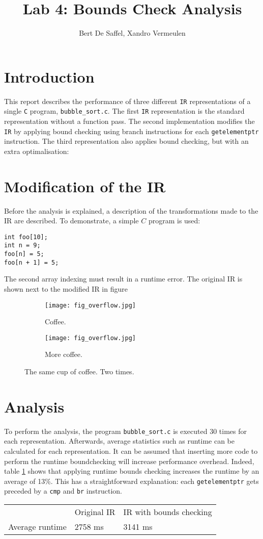 \documentclass{article}
\begin{document}
	\title{Lab 4: Bounds Check Analysis}
	\author{Bert De Saffel, Xandro Vermeulen}
	\maketitle
	\tableofcontents
	\section{Introduction}
	This report describes the performance of three different \texttt{IR} representations of a single \texttt{C} program, \texttt{bubble\_sort.c}. The first \texttt{IR} representation is the standard representation without a function pass. The second implementation modifies the \texttt{IR} by applying bound checking using branch instructions for each \texttt{getelementptr} instruction. The third representation also applies bound checking, but with an extra optimalisation: 
	
	\section{Modification of the IR}
	Before the analysis is explained, a description of the transformations made to the IR are described. To demonstrate, a simple $C$ program is used:
	\begin{lstlisting}
int foo[10];
int n = 9;
foo[n] = 5;
foo[n + 1] = 5;
	\end{lstlisting}
The second array indexing must result in a runtime error. The original IR is shown next to the modified IR in figure 
\begin{figure}[h!]
	\centering
	\begin{subfigure}[b]{0.4\linewidth}
		\texttt{[image: fig\_overflow.jpg]}
		\caption{Coffee.}
	\end{subfigure}
	\begin{subfigure}[b]{0.4\linewidth}
		\texttt{[image: fig\_overflow.jpg]}
		\caption{More coffee.}
	\end{subfigure}
	\caption{The same cup of coffee. Two times.}
	\label{fig:coffee}
\end{figure}

	\section{Analysis}
	To perform the analysis, the program \texttt{bubble\_sort.c} is executed 30 times for each representation. Afterwards, average statistics such as runtime can be calculated for each representation. It can be assumed that inserting more code to perform the runtime boundchecking will increase performance overhead. Indeed, table \ref{table:1} shows that applying runtime bounds checking increases the runtime by an average of 13\%. This has a straightforward explanation: each \texttt{getelementptr} gets preceded by a \texttt{cmp} and \texttt{br} instruction.
	
	\begin{table}
		\centering
		\begin{tabular}{ l | l | l |}
			& Original IR & IR with bounds checking \\
			Average runtime & 2758 ms & 3141 ms
		\end{tabular}
		\label{table:1}
	\end{table}
	
	
	
	
\end{document}
